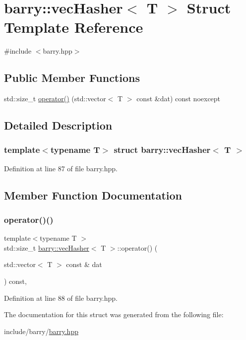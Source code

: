 \hypertarget{structbarry_1_1vec_hasher}{}\section{barry\+:\+:vec\+Hasher$<$ T $>$ Struct Template Reference}
\label{structbarry_1_1vec_hasher}


{\ttfamily \#include $<$barry.\+hpp$>$}

\subsection*{Public Member Functions}
\begin{DoxyCompactItemize}
\item 
std\+::size\+\_\+t \hyperlink{structbarry_1_1vec_hasher_ada8dea483f4fc12f469e161b2fd09225}{operator()} (std\+::vector$<$ T $>$ const \&dat) const noexcept
\end{DoxyCompactItemize}


\subsection{Detailed Description}
\subsubsection*{template$<$typename T$>$\newline
struct barry\+::vec\+Hasher$<$ T $>$}



Definition at line 87 of file barry.\+hpp.



\subsection{Member Function Documentation}
\mbox{\label{structbarry_1_1vec_hasher_ada8dea483f4fc12f469e161b2fd09225}} 
\subsubsection{\texorpdfstring{operator()()}{operator()()}}
{\footnotesize\ttfamily template$<$typename T $>$ \\
std\+::size\+\_\+t \hyperlink{structbarry_1_1vec_hasher}{barry\+::vec\+Hasher}$<$ T $>$\+::operator() (\begin{DoxyParamCaption}\item[{std\+::vector$<$ T $>$ const \&}]{dat }\end{DoxyParamCaption}) const\hspace{0.3cm}{\ttfamily [inline]}, {\ttfamily [noexcept]}}



Definition at line 88 of file barry.\+hpp.



The documentation for this struct was generated from the following file\+:\begin{DoxyCompactItemize}
\item 
include/barry/\hyperlink{barry_8hpp}{barry.\+hpp}\end{DoxyCompactItemize}
